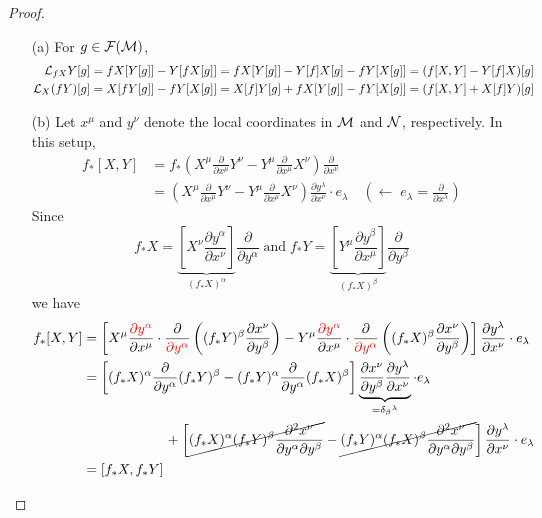\documentclass[a4paper, 10pt]{article}
\begin{document}
\begin{proof}
    \begin{itemize}
        \item[(a)] For $g \in \mathcal{F}(\mathcal{M})$,
        \begin{align*}
            \mathcal{L}_{fX}Y[g] &= fX[Y[g]] - Y[fX[g]] = fX[Y[g]] - Y[f]X[g] - fY[X[g]] = (f[X,Y] - Y[f]X)[g] \\
            \mathcal{L}_{X}(fY)[g] &= X[fY[g]] - fY[X[g]] = X[f]Y[g] + fX[Y[g]] - fY[X[g]] = (f[X,Y] + X[f]Y)[g]
        \end{align*}
        \item[(b)] Let $x^{\mu}$ and $y^{\nu}$ denote the local coordinates in $\mathcal{M}$ and $\mathcal{N}$, respectively. In this setup,
        \begin{align*}
            f_{\ast}[X,Y] &= f_{\ast}\left(X^{\mu}\frac{\partial}{\partial x^{\mu}}Y^{\nu} - Y^{\mu}\frac{\partial}{\partial x^{\mu}}X^{\nu}\right)\frac{\partial}{\partial x^{\nu}} \\
            &= \left(X^{\mu}\frac{\partial}{\partial x^{\mu}}Y^{\nu} - Y^{\mu}\frac{\partial}{\partial x^{\mu}}X^{\nu}\right)\frac{\partial y^{\lambda}}{\partial x^{\nu}} \cdot e_{\lambda} \quad (\leftarrow \; e_{\lambda} = \frac{\partial}{\partial x^{\lambda}})
        \end{align*}
        Since
        \[ f_{\ast}X = \underbrace{\left[X^{\nu}\frac{\partial y^{\alpha}}{\partial x^{\nu}}\right]}_{(f_{\ast}X)^{\alpha}}\frac{\partial}{\partial y^{\alpha}} \;\text{and}\; f_{\ast}Y = \underbrace{\left[Y^{\mu}\frac{\partial y^{\beta}}{\partial x^{\mu}}\right]}_{(f_{\ast}X)^{\beta}}\frac{\partial}{\partial y^{\beta}} \]
        we have
        \begin{align*}
            f_{\ast}[X, Y] &= \left[ X^{\mu} \frac{\textcolor{red}{\partial y^{\alpha}}}{\partial x^{\mu}} \cdot \frac{\partial}{\textcolor{red}{\partial y^{\alpha}}} \left((f_{\ast}Y)^{\beta}\frac{\partial x^{\nu}}{\partial y^{\beta}}\right) - Y^{\mu} \frac{\textcolor{red}{\partial y^{\alpha}}}{\partial x^{\mu}} \cdot \frac{\partial}{\textcolor{red}{\partial y^{\alpha}}} \left((f_{\ast}X)^{\beta}\frac{\partial x^{\nu}}{\partial y^{\beta}}\right) \right]\frac{\partial y^{\lambda}}{\partial x^{\nu}} \cdot e_{\lambda} \\
            &= \left[ (f_{\ast}X)^{\alpha}\frac{\partial}{\partial y^{\alpha}}(f_{\ast}Y)^{\beta} - (f_{\ast}Y)^{\alpha}\frac{\partial}{\partial y^{\alpha}}(f_{\ast}X)^{\beta}  \right] \underbrace{\frac{\partial x^{\nu}}{\partial y^{\beta}}\frac{\partial y^{\lambda}}{\partial x^{\nu}}}_{=\delta_{\beta}{}^{\lambda}} \cdot e_{\lambda} \\
            & \qquad\qquad\qquad +\left[ \cancel{(f_{\ast}X)^{\alpha}(f_{\ast}Y)^{\beta}\frac{\partial^{2}x^{\nu}}{\partial y^{\alpha}\partial y^{\beta}}} - \cancel{(f_{\ast}Y)^{\alpha}(f_{\ast}X)^{\beta}\frac{\partial^{2}x^{\nu}}{\partial y^{\alpha}\partial y^{\beta}}} \right]\frac{\partial y^{\lambda}}{\partial x^{\nu}} \cdot e_{\lambda} \\
            &= [f_{\ast}X, f_{\ast}Y]
        \end{align*}
    \end{itemize}
\end{proof}
\end{document}

